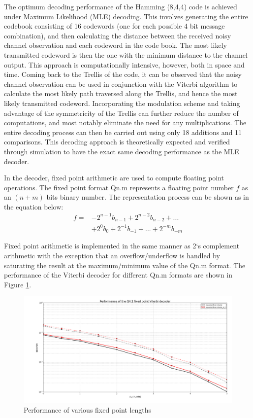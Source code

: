 \documentclass[conference]{IEEEtran}
\begin{document}
The optimum decoding performance of the Hamming (8,4,4) code is achieved under Maximum Likelihood (MLE) decoding. This involves generating the entire codebook consisting of 16 codewords (one for each possible 4 bit message combination), and then calculating the distance between the received noisy channel observation and each codeword in the code book. The most likely transmitted codeword is then the one with the minimum distance to the channel output. This approach is computationally intensive, however, both in space and time. Coming back to the Trellis of the code, it can be observed that the noisy channel observation can be used in conjunction with the Viterbi algorithm to calculate the most likely path traversed along the Trellis, and hence the most likely transmitted codeword. Incorporating the modulation scheme and taking advantage of the symmetricity of the Trellis can further reduce the number of computations, and most notably eliminate the need for any multiplications. The entire decoding process can then be carried out using only 18 additions and 11 comparisons. This decoding approach is theoretically expected and verified through simulation to have the exact same decoding performance as the MLE decoder.

In the decoder, fixed point arithmetic are used to compute floating point operations. The fixed point format Qn.m represents a floating point number $f$ as an $(n+m)$ bits binary number. The representation process can be shown as in the equation below:
\begin{equation}
\begin{align*}
f = &-2^{n-1}b_{n-1}+2^{n-2}b_{n-2}+...\\
&+2^{0}b_{0}+2^{-1}b_{-1}+...+2^{-m}b_{-m}
\end{align*}
\end{equation}

Fixed point arithmetic is implemented in the same manner as 2`s complement arithmetic with the exception that an overflow/underflow is handled by saturating the result at the maximum/minimum value of the Qn.m format. The performance of the Viterbi decoder for different Qn.m formats are shown in Figure \ref{fig:qnm}.
\begin{figure}[h!]
\centering
\includegraphics[scale=0.4]{qnm}
\caption{Performance of various fixed point lengths}
\label{fig:qnm}
\end{figure}
\end{document}
